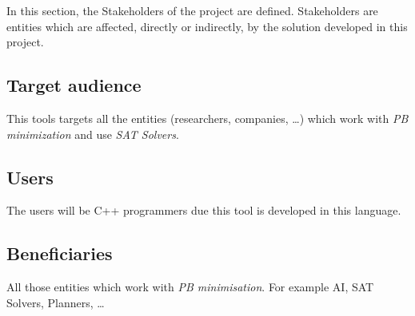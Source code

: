 In this section, the Stakeholders of the project are defined. Stakeholders are entities which are affected, directly or indirectly, by the solution developed in this project. 
\subsection{Target audience}
This tools targets all the entities (researchers, companies, \ldots) which work with \emph{PB minimization} and use \emph{SAT Solvers}.
\subsection{Users}
The users will be C++ programmers due this tool is developed in this language.
\subsection{Beneficiaries}
All those entities which work with \emph{PB minimisation}. For example AI, SAT Solvers, Planners, \ldots